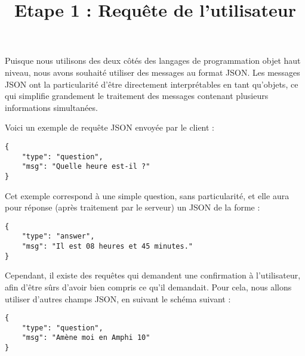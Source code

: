 \documentclass[a4paper,10pt]{report}
\begin{document}
          {Puisque nous utilisons des deux côtés des langages de programmation objet haut niveau, nous avons souhaité utiliser des messages au format JSON. Les messages JSON ont la particularité d'être directement interprétables en tant qu'objets, ce qui simplifie grandement le traitement des messages contenant plusieurs informations
          simultanées.\newline}


          {Voici un exemple de requête JSON envoyée par le client :}
          \begin{listing}[h]
            \begin{verbatim}
{
    "type": "question",
    "msg": "Quelle heure est-il ?"
}
            \end{verbatim}
          \end{listing}

          {Cet exemple correspond à une simple question, sans particularité, et elle aura pour réponse (après traitement par le serveur) un JSON de la forme :}

          \begin{listing}[h]
            \begin{verbatim}
{
    "type": "answer",
    "msg": "Il est 08 heures et 45 minutes."
}
            \end{verbatim}
          \end{listing}

          {Cependant, il existe des requêtes qui demandent une confirmation à l'utilisateur, afin d'être sûrs d'avoir bien compris ce qu'il demandait. Pour cela, nous allons utiliser d'autres champs JSON, en suivant le schéma suivant :}

          \begin{listing}[h]
            \begin{verbatim}
{
    "type": "question",
    "msg": "Amène moi en Amphi 10"
}
            \end{verbatim}
            \title{Etape 1 : Requête de l'utilisateur}
          \end{listing}
\end{document}
